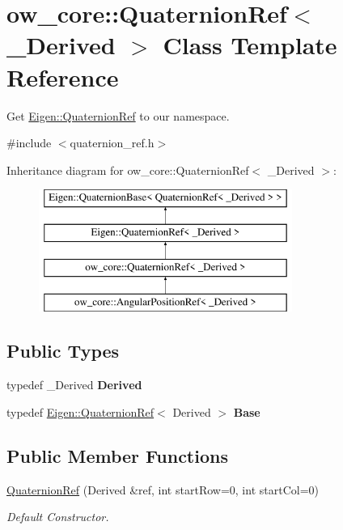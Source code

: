 \hypertarget{classow__core_1_1QuaternionRef}{}\section{ow\+\_\+core\+:\+:Quaternion\+Ref$<$ \+\_\+\+Derived $>$ Class Template Reference}
\label{classow__core_1_1QuaternionRef}


Get \hyperlink{classEigen_1_1QuaternionRef}{Eigen\+::\+Quaternion\+Ref} to our namespace.  




{\ttfamily \#include $<$quaternion\+\_\+ref.\+h$>$}

Inheritance diagram for ow\+\_\+core\+:\+:Quaternion\+Ref$<$ \+\_\+\+Derived $>$\+:\begin{figure}[H]
\begin{center}
\leavevmode
\includegraphics[height=4.000000cm]{d8/dae/classow__core_1_1QuaternionRef}
\end{center}
\end{figure}
\subsection*{Public Types}
\begin{DoxyCompactItemize}
\item 
typedef \+\_\+\+Derived {\bfseries Derived}\hypertarget{classow__core_1_1QuaternionRef_a0a3fe2b7030b00914878ab4ad65faa1d}{}\label{classow__core_1_1QuaternionRef_a0a3fe2b7030b00914878ab4ad65faa1d}

\item 
typedef \hyperlink{classEigen_1_1QuaternionRef}{Eigen\+::\+Quaternion\+Ref}$<$ Derived $>$ {\bfseries Base}\hypertarget{classow__core_1_1QuaternionRef_a3beee92d95baf28e734df3ef3a795fb5}{}\label{classow__core_1_1QuaternionRef_a3beee92d95baf28e734df3ef3a795fb5}

\end{DoxyCompactItemize}
\subsection*{Public Member Functions}
\begin{DoxyCompactItemize}
\item 
\hyperlink{classow__core_1_1QuaternionRef_a7752f6e95ec9704285d1c5fc5d7ba2ee}{Quaternion\+Ref} (Derived \&ref, int start\+Row=0, int start\+Col=0)
\begin{DoxyCompactList}\small\item\em Default Constructor. \end{DoxyCompactList}\end{DoxyCompactItemize}

